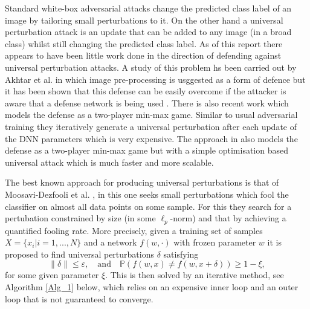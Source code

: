 \documentclass[12pt]{article}
\begin{document}
Standard white-box adversarial attacks change the predicted class label of an image by tailoring small perturbations to it. On the other hand a universal perturbation attack is an update that can be added to any image (in a broad class) whilst still changing the predicted class label. As of this report there appears to have been little work done in the direction of defending against universal perturbation attacks. A study of this problem hs been carried out by Akhtar et al. \cite{akhtar_defense_2018} in which image pre-processing is usggested as a form of defence but it has been shown that this defense can be easily overcome if the attacker is aware that a defense network is being used \cite{carlini_adversarial_2017}. There is also recent work \cite{perolat_playing_2018} which models the defense as a two-player min-max game. Similar to usual adversarial training they iteratively generate a universal perturbation after each update of the DNN parameters which is very expensive. The approach in \cite{shafahi_universal_2018} also models the defense as a two-player min-max game but with a simple optimisation based universal attack which is much faster and more scalable.

The best known approach for producing universal perturbations is that of Moosavi-Dezfooli et al. \cite{moosavi-dezfooli_universal_2017}, in this one seeks small perturbations which fool the classifier on almost all data points on some sample. For this they search for a pertubation constrained by size (in some $\ell_p$-norm) and that by achieving a quantified fooling rate.  More precisely, given a training set of samples $X=\{ x_i | i=1,...,N \}$ and a network $f(w,\cdot)$ with frozen parameter $w$ it is proposed to find universal perturbations $\delta$ satisfying 
$$\| \delta \| \leq \varepsilon, \quad \text{and} \quad \mathbb{P}(f(w, x) \neq f(w, x + \delta)) \geq 1-\xi,$$
for some given parameter $\xi$. This is then solved by an iterative method, see Algorithm \ref{Alg_1} below, which relies on an expensive inner loop and an outer loop that is not guaranteed to converge.  

\end{document}
